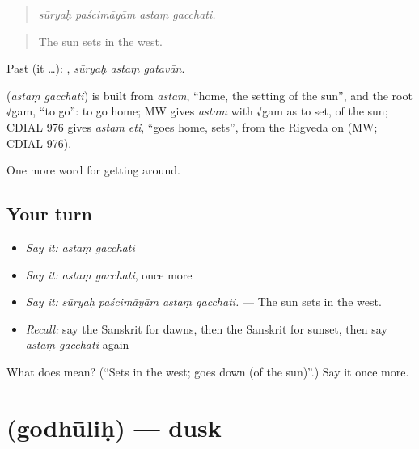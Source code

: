 \begin{quote}
\emph{sūryaḥ paścimāyām astaṃ gacchati.}
\end{quote}

\begin{quote}
The sun sets in the west.
\end{quote}

Past (it …):   , \emph{sūryaḥ astaṃ gatavān}.

\begin{cousinweb}
\textbf{ } (\emph{astaṃ gacchati}) is built from \emph{astam}, \textquotedblleft{}home, the setting of the sun\textquotedblright{}, and the root √gam, \textquotedblleft{}to go\textquotedblright{}: to go home; MW gives \emph{astam} with √gam as to set, of the sun; CDIAL 976 gives \emph{astam eti}, \textquotedblleft{}goes home, sets\textquotedblright{}, from the Rigveda on (MW; CDIAL 976).
\end{cousinweb}

\begin{grammarlens}[title={What you've built}]
One more word for getting around.
\end{grammarlens}

\subsection*{Your turn}
\begin{itemize}
\raggedright
  \item \emph{Say it:} \emph{astaṃ gacchati}
  \item \emph{Say it:} \emph{astaṃ gacchati}, once more
  \item \emph{Say it:} \emph{sūryaḥ paścimāyām astaṃ gacchati.} — The sun sets in the west.
  \item \emph{Recall:} say the Sanskrit for dawns, then the Sanskrit for sunset, then say \emph{astaṃ gacchati} again
\end{itemize}

\begin{tcolorbox}[breakable,colback=teal!4,colframe=teal!35!black,title={Before you move on}]
What does   mean? (\textquotedblleft{}Sets in the west; goes down (of the sun)\textquotedblright{}.) Say it once more.
\end{tcolorbox}
\section[\texorpdfstring{\sk{गोधूलिः} (godhūliḥ)}{गोधूलिः (godhūliḥ)}]{ (godhūliḥ) — dusk}

